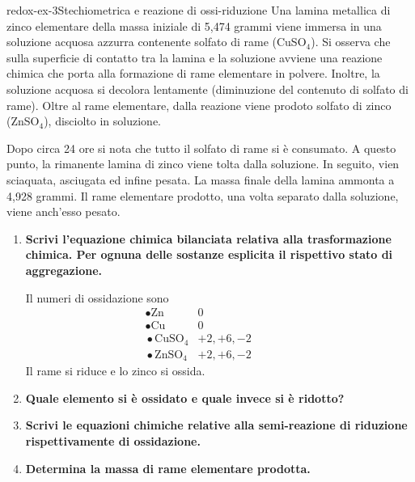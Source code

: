 \documentclass[preview]{standalone}
\begin{document}
\begin{snippetexercise}{redox-ex-3}{Stechiometrica e reazione di ossi-riduzione}
    Una lamina metallica di zinco elementare della massa iniziale
    di 5,474 grammi viene immersa in una soluzione
    acquosa azzurra contenente solfato di rame
    (CuSO\({}_4\)).
    Si osserva che sulla superficie di contatto
    tra la lamina e la soluzione avviene una reazione
    chimica che porta alla formazione
    di rame elementare in polvere.
    Inoltre, la soluzione acquosa si decolora lentamente
    (diminuzione del contenuto di solfato di rame).
    Oltre al rame elementare,
    dalla reazione viene prodoto solfato di zinco
    (ZnSO\({}_4\)), disciolto in soluzione.

    Dopo circa 24 ore si nota che tutto il solfato di rame si è consumato.
    A questo punto, la rimanente lamina di zinco viene tolta dalla soluzione. In seguito,
    vien sciaquata, asciugata ed infine pesata.
    La massa finale della lamina ammonta a 4,928 grammi.
    Il rame elementare prodotto, una volta separato
    dalla soluzione, viene anch'esso pesato.

    \begin{enumerate}
        \item \textbf{Scrivi l'equazione chimica bilanciata relativa alla
        trasformazione chimica. Per ognuna delle sostanze esplicita
        il rispettivo stato di aggregazione.}

        Il numeri di ossidazione sono
        \begin{align*}
            &\,\bullet \text{Zn} & 0 &&&&&&\\
            &\,\bullet \text{Cu} & 0 &&&&&&\\
            &\,\bullet \text{CuSO}_4 & +2, +6, -2 &&&&&&\\
            &\,\bullet \text{ZnSO}_4 & +2, +6, -2 &&&&&&
        \end{align*}
        Il rame si riduce e lo zinco si ossida.

        \item \textbf{Quale elemento si è ossidato e quale invece si è ridotto?}

        \item \textbf{Scrivi le equazioni chimiche relative alla semi-reazione
        di riduzione rispettivamente di ossidazione.}

        \item \textbf{Determina la massa di rame elementare prodotta.}


\end{enumerate}
\end{snippetexercise}
\end{document}
